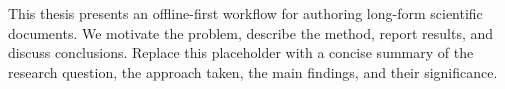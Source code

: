 
This thesis presents an offline-first workflow for authoring long-form scientific
documents. We motivate the problem, describe the method, report results, and
discuss conclusions. Replace this placeholder with a concise summary of the
research question, the approach taken, the main findings, and their significance.

